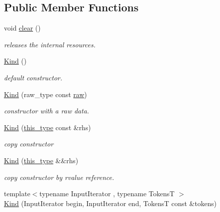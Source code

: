\subsection*{Public Member Functions}
\begin{DoxyCompactItemize}
\item 
\hypertarget{classhryky_1_1_kind_aa84071f7355cabc0be31763a106e18e7}{void \hyperlink{classhryky_1_1_kind_aa84071f7355cabc0be31763a106e18e7}{clear} ()}\label{classhryky_1_1_kind_aa84071f7355cabc0be31763a106e18e7}

\begin{DoxyCompactList}\small\item\em releases the internal resources. \end{DoxyCompactList}\item 
\hypertarget{classhryky_1_1_kind_a7227a84a0d37701c73b1a0018885532d}{\hyperlink{classhryky_1_1_kind_a7227a84a0d37701c73b1a0018885532d}{Kind} ()}\label{classhryky_1_1_kind_a7227a84a0d37701c73b1a0018885532d}

\begin{DoxyCompactList}\small\item\em default constructor. \end{DoxyCompactList}\item 
\hypertarget{classhryky_1_1_kind_a6be5c110c872e8ec9ac98e2dcf4f38ab}{\hyperlink{classhryky_1_1_kind_a6be5c110c872e8ec9ac98e2dcf4f38ab}{Kind} (raw\-\_\-type const \hyperlink{classhryky_1_1_kind_a092c3dbb200b1fc4e83bebff274ba23e}{raw})}\label{classhryky_1_1_kind_a6be5c110c872e8ec9ac98e2dcf4f38ab}

\begin{DoxyCompactList}\small\item\em constructor with a raw data. \end{DoxyCompactList}\item 
\hyperlink{classhryky_1_1_kind_a9bdba184a76801cc81c8e9625f7c54f7}{Kind} (\hyperlink{classhryky_1_1_kind}{this\-\_\-type} const \&rhs)
\begin{DoxyCompactList}\small\item\em copy constructor \end{DoxyCompactList}\item 
\hypertarget{classhryky_1_1_kind_a663875668d2796e64096d23ab340cc15}{\hyperlink{classhryky_1_1_kind_a663875668d2796e64096d23ab340cc15}{Kind} (\hyperlink{classhryky_1_1_kind}{this\-\_\-type} \&\&rhs)}\label{classhryky_1_1_kind_a663875668d2796e64096d23ab340cc15}

\begin{DoxyCompactList}\small\item\em copy constructor by rvalue reference. \end{DoxyCompactList}\item 
\hypertarget{classhryky_1_1_kind_a79a87dd56f32e4a504debb01de36e659}{{\footnotesize template$<$typename Input\-Iterator , typename Tokens\-T $>$ }\\\hyperlink{classhryky_1_1_kind_a79a87dd56f32e4a504debb01de36e659}{Kind} (Input\-Iterator begin, Input\-Iterator end, Tokens\-T const \&tokens)}\label{classhryky_1_1_kind_a79a87dd56f32e4a504debb01de36e659}


\end{DoxyCompactItemize}
